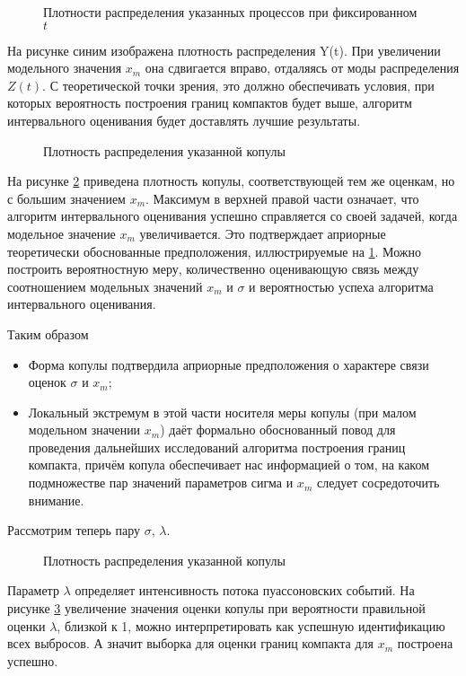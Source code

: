 \begin{figure}[h]
	{}
	\caption{Плотности распределения указанных процессов при фиксированном $t$}
	\label{fig:zy}
\end{figure}
На рисунке синим изображена плотность распределения Y(t). При увеличении модельного значения $x_m$ она сдвигается вправо, отдаляясь от моды распределения $Z(t)$. С теоретической точки зрения, это должно обеспечивать условия, при которых вероятность построения границ компактов будет выше, алгоритм интервального оценивания будет доставлять лучшие результаты.


\begin{figure}[H]
	{}
	\caption{Плотность распределения указанной копулы}
	\label{fig:bigxm}
\end{figure}
На рисунке \ref{fig:bigxm} приведена плотность копулы, соответствующей тем же оценкам, но с большим значением $x_m$. Максимум в верхней правой части означает, что алгоритм интервального оценивания успешно справляется со своей задачей, когда модельное значение $x_m$ увеличивается. Это подтверждает априорные теоретически обоснованные предположения, иллюстрируемые на \ref{fig:zy}. Можно построить вероятностную меру, количественно оценивающую связь между соотношением  модельных значений $x_m$ и $\sigma$ и вероятностью успеха  алгоритма интервального оценивания.

Таким образом
\begin{itemize}
  \item Форма копулы подтвердила априорные предположения о характере связи оценок $\sigma$ и $x_m$;
  \item Локальный экстремум в этой части носителя меры копулы  (при малом модельном значении $x_m$) даёт формально обоснованный повод для проведения дальнейших исследований алгоритма построения границ компакта, причём копула обеспечивает нас информацией о том, на каком подмножестве пар значений параметров сигма и $x_m$ следует сосредоточить внимание.
\end{itemize}

Рассмотрим теперь пару $\sigma$, $\lambda$.
\begin{figure}[H]
	{}
	\caption{Плотность распределения указанной копулы}
	\label{fig:smalllambda}
\end{figure}
Параметр $\lambda$ определяет интенсивность потока пуассоновских событий. На рисунке \ref{fig:smalllambda} увеличение значения оценки копулы при вероятности правильной оценки $\lambda$, близкой к 1, можно интерпретировать как успешную идентификацию всех выбросов. А значит выборка для оценки границ компакта для $x_m$ построена успешно.

